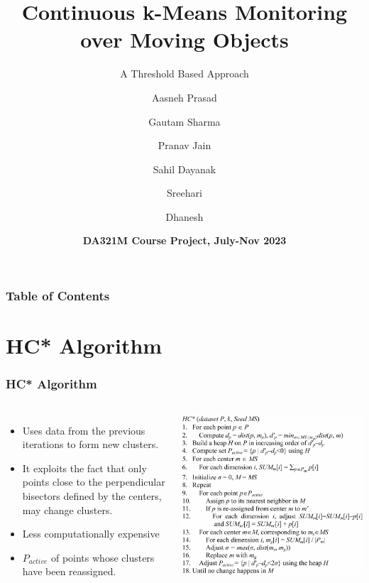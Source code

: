 \documentclass{beamer}
\title[Threshold Based \textit{K}-Means Monitoring] %
{Continuous k-Means Monitoring
over Moving Objects}
\subtitle{A Threshold Based Approach}
\author[Group 7] %
{Aasneh Prasad \and Gautam Sharma \and Pranav Jain \and Sahil Dayanak \and Sreehari \and Dhanesh}
\date[16th November 2023] %
{\textbf{DA321M Course Project, July-Nov 2023}}
\begin{document}
\frame{\titlepage}


\begin{frame}
\frametitle{Table of Contents}
\tableofcontents
\end{frame}


\section{HC* Algorithm}
\begin{frame}
\frametitle{HC* Algorithm}

\begin{columns}

\begin{itemize}
\item Uses data from the previous iterations to form new clusters.
\item  It exploits the fact that only points close to the perpendicular bisectors defined by the centers, may change clusters.
\item Less computationally expensive
\item $P_{active}$ of points whose clusters have been reassigned.

\end{itemize}

\includegraphics[width=1\textwidth]{Pic1.png}

\end{columns}
\end{frame}
\end{document}
